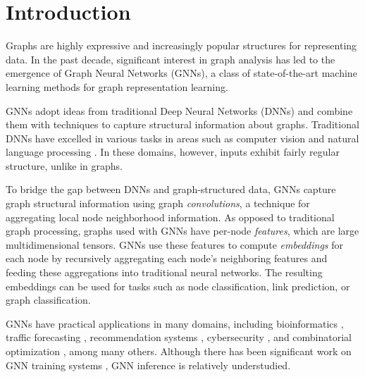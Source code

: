 \chapter{Introduction}

Graphs are highly expressive and increasingly popular structures for representing data.
In the past decade, significant interest in graph analysis has led to the emergence of Graph Neural Networks (GNNs), a class of state-of-the-art machine learning methods for graph representation learning. 

GNNs adopt ideas from traditional Deep Neural Networks (DNNs) and combine them with techniques to capture structural information about graphs. Traditional DNNs have excelled in various tasks in areas such as computer vision \cite{AlexNet_2012}\cite{YOLO_2016} and natural language processing \cite{RNN_2013}\cite{NamedEntityRecognition_2016}. In these domains, however, inputs exhibit fairly regular structure, unlike in graphs. 

To bridge the gap between DNNs and graph-structured data, GNNs capture graph structural information using graph \textit{convolutions}, a technique for aggregating local node neighborhood information. As opposed to traditional graph processing, graphs used with GNNs have per-node \textit{features}, which are large multidimensional tensors. GNNs use these features to compute \textit{embeddings} for each node by recursively aggregating each node's neighboring features and feeding these aggregations into traditional neural networks. 
The resulting embeddings can be used for tasks such as node classification, link prediction, or graph classification.

GNNs have practical applications in many domains, including bioinformatics \cite{Bioinfo_2021} \cite{Bioinfo_2022}, 
traffic forecasting \cite{Traffic_SST-GNN_2021} \cite{Traffic_GoogleMaps_2021} \cite{Traffic_survey_2021}, recommendation systems \cite{Recsys_PinSAGE_2018} \cite{Recsys_Diffnet_2022}\cite{Recsys_LightGCN_2020}\cite{Recsys_NAGCN_2020}\cite{Recsys_SGL_2021}\cite{Recsys_Survey_2022}, 
cybersecurity \cite{Cybersec_2022} \cite{Cybersec_2023}, and combinatorial optimization \cite{CombinatorialOptimization_2019}\cite{CombinatorialOptimization_2021}, among many others. Although there has been significant work on GNN training systems \cite{P3_2021}\cite{PaGraph_2020}\cite{BGL_2023}\cite{GNNLab_2022}, GNN inference is relatively understudied. 

